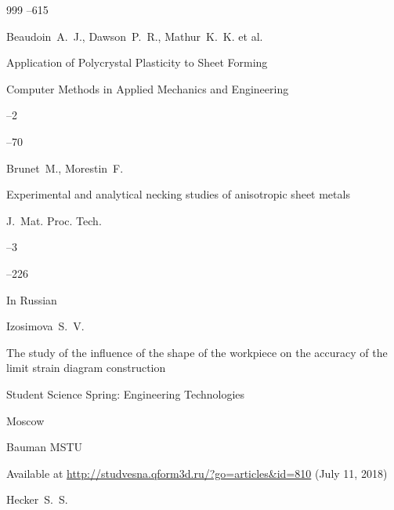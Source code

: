 \begin{thebibliography}{999}
--615






\by Beaudoin~A.~J., Dawson~P.~R., Mathur~K.~K. et al.

\paper Application of Polycrystal Plasticity to Sheet Forming

\jour Computer Methods in Applied Mechanics and Engineering



--2

--70






\by Brunet~M., Morestin~F. 

\paper Experimental and analytical necking studies of anisotropic sheet metals

\jour J.~Mat. Proc. Tech.



--3

--226






\lang In Russian

\by Izosimova~S.~V. 

\paper The study of the influence of the shape of the workpiece on the accuracy of the limit strain diagram construction

\inbook Student Science Spring: Engineering Technologies

\publaddr Moscow

\publ Bauman MSTU 

\elink Available at \url{http://studvesna.qform3d.ru/?go=articles&id=810} (July 11, 2018)






\by Hecker~S.~S. 


\end{thebibliography}
